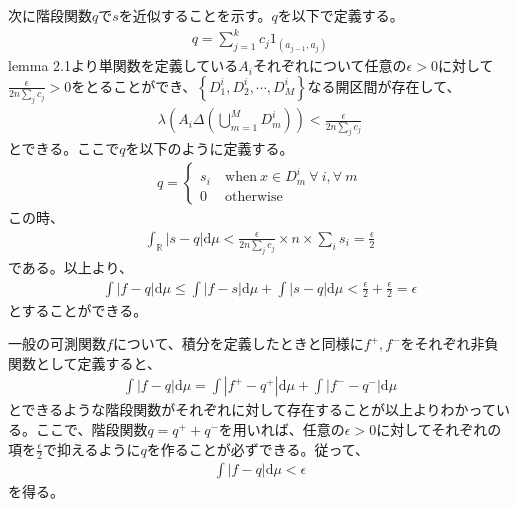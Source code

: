 \documentclass{article}
\begin{document}
次に階段関数$q$で$s$を近似することを示す。$q$を以下で定義する。
\begin{align*}
	q = \sum_{j = 1}^k c_j 1_{(a_{j-1}, a_j)}
\end{align*}
lemma 2.1より単関数を定義している$A_i$それぞれについて任意の$\epsilon > 0$に対して$\frac{\epsilon}{2n\sum_j c_j} > 0$をとることができ、$\left\{ D_1^i, D_2^i, \cdots, D_M^i \right\}$なる開区間が存在して、
\begin{align*}
	\lambda\left( A_i \Delta \left( \bigcup_{m = 1}^M D_m^i \right) \right) < \frac{\epsilon}{2n\sum_j c_j} 
\end{align*}
とできる。ここで$q$を以下のように定義する。
\begin{align*}
	q = \begin{cases}
	s_i \ &\text{when}\ x \in D_m^i\ \forall\ i,\forall\ m\\
	0\ &\text{otherwise}
	\end{cases}
\end{align*}
この時、
\begin{align*}
	\int_{\mathbb{R}} \left| s - q \right| \mathrm{d}\mu < \frac{\epsilon}{2n\sum_j c_j} \times n \times \sum_i s_i = \frac{\epsilon}{2}
\end{align*}
である。以上より、
\begin{align*}
	\int |f-q|\mathrm{d}\mu \leq \int |f-s| \mathrm{d}\mu + \int |s-q | \mathrm{d}\mu < \frac{\epsilon}{2} + \frac{\epsilon}{2} = \epsilon
\end{align*}
とすることができる。

一般の可測関数$f$について、積分を定義したときと同様に$f^{+}, f^{-}$をそれぞれ非負関数として定義すると、
\begin{align*}
	\int |f-q|\mathrm{d}\mu = \int |f^{+} - q^{+}| \mathrm{d}\mu + \int |f^{-} - q^{-}| \mathrm{d}\mu
\end{align*}
とできるような階段関数がそれぞれに対して存在することが以上よりわかっている。ここで、階段関数$q = q^{+} + q^{-}$を用いれば、任意の$\epsilon > 0$に対してそれぞれの項を$\frac{\epsilon}{2}$で抑えるように$q$を作ることが必ずできる。従って、
\begin{align*}
	\int |f-q|\mathrm{d}\mu < \epsilon
\end{align*}
を得る。
\end{document}
